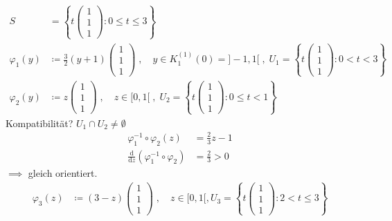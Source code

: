 \begin{example} \label{thm:9.10}
  \begin{enum-arab}
    \item ~
    \begin{align*}
      S &= \left\{ t \left(\begin{smallmatrix} 1 \\ 1 \\ 1 \end{smallmatrix}\right) : 0 \leq t \leq 3 \right\} \\
      \varphi_1(y) &\coloneq \frac{3}{2} (y+1) \begin{pmatrix} 1 \\ 1 \\ 1 \end{pmatrix} \; , \quad y \in K_1^{(1)}(0) = ]-1,1[ \; , \; U_1 = \left\{ t \left(\begin{smallmatrix} 1 \\ 1 \\ 1 \end{smallmatrix}\right) : 0 < t < 3 \right\} \\
      \varphi_2(y) &\coloneq z \begin{pmatrix} 1 \\ 1 \\ 1 \end{pmatrix} \; , \quad z \in [0,1[ \; , \; U_2 = \left\{ t \left(\begin{smallmatrix} 1 \\ 1 \\ 1 \end{smallmatrix}\right) : 0 \leq t < 1 \right\}
    \end{align*}
    Kompatibilität? $U_1 \cap U_2 \neq \emptyset$
    \begin{align*}
      \varphi_1^{-1} \circ \varphi_2(z) &= \frac{2}{3} z - 1 \\
      \frac{\mathrm{d}}{\mathrm{d}z} \left( \varphi_1^{-1} \circ \varphi_2 \right) &= \frac{2}{3} > 0
    \end{align*}
    $\implies$ gleich orientiert.
    \begin{align*}
      \varphi_3(z) &\coloneq (3-z) \begin{pmatrix} 1 \\ 1 \\ 1 \end{pmatrix} \; , \quad z \in [0,1[ , U_3 = \left\{ t \left(\begin{smallmatrix} 1 \\ 1 \\ 1 \end{smallmatrix}\right) : 2 < t \leq 3 \right\}

\end{align*}
\end{enum-arab}
\end{example}
